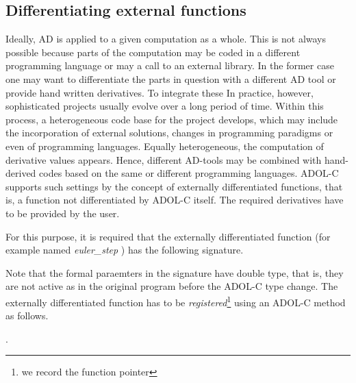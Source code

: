 \documentclass[11pt,twoside]{article}
\begin{document}
\subsection{Differentiating external functions}
%
Ideally, AD is applied to a given computation as a whole.
This is not always possible because parts of the computation may 
be coded in a different programming language or may a call to 
an external library. 
In the former case one may want to differentiate the parts in 
question with a different AD tool or provide hand written derivatives. 
To integrate these 
In practice, however, sophisticated projects usually evolve over a long period of time.
Within this process, a heterogeneous code base for the project
develops, which may include the incorporation of external solutions,
changes in programming paradigms or even of programming languages.
Equally heterogeneous, the computation of derivative values appears.
Hence, different \mbox{AD-tools} may be combined with hand-derived
codes based on the same or different programming languages. 
ADOL-C supports such settings  by  the concept of externally
differentiated functions, that is, a function
not differentiated by ADOL-C itself. The required derivatives
have to be provided by the user.

For this purpose, it is required that the externally differentiated
function (for example named {\sf\em euler\_step} ) has the following signature.
\smallskip

\noindent
\hspace*{2cm}{\sf int euler\_step(int n, double *x, int m, double *y);}
\medskip

\noindent
Note that the formal paraemters in the signature have {\sf double} type, that is, 
they are not active as in the original program before the ADOL-C type change.
The externally differentiated function has to
be {\em registered}\footnote{we record the function pointer} using an \mbox{ADOL-C} method as follows. 
\smallskip

\noindent
\hspace*{2cm}{\sf ext\_diff\_fct *edf = reg\_ext\_fct(euler\_step);}.
\smallskip
\end{document}
